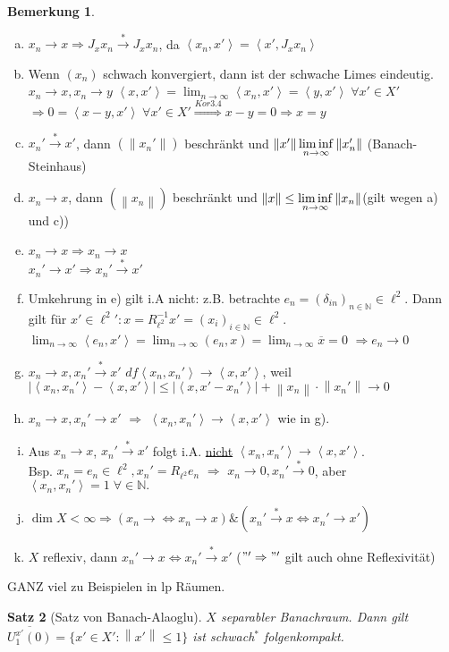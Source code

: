 \documentclass[ngerman]{report}
\theoremstyle{plain}%
\newtheorem{thm}{Satz}[chapter]
\theoremstyle{definition}%
\theoremstyle{myStyle}
\newtheorem{bem}[thm]{Bemerkung}
\newcommand{\N}{\mathbb{N}}
\newcommand{\norm}[1]{\left \|#1\right\| }
\newcommand{\df}[1][]{%
	\overset{#1}{\Rightarrow}
}
\newcommand{\aq}{\Leftrightarrow} %
\newcommand{\limes}[1][\infty]{\lim_{n \to #1}}
\newcommand{\inv}[1]{#1^{-1}}
\newcommand{\ov}[1]{\overline{#1}}
\newcommand{\set}[1]{\{#1\}} %
\newcommand{\fop}[1]{\left \langle #1 \right \rangle} %
\newcommand{\wkc}{\longrightarrow} %
\newcommand{\wskc}{\overset{*}{\longrightarrow}} %
\begin{document}
	\begin{bem}
		\begin{enumerate}[a)]
			\item  $x_n \longrightarrow x \df J_x x_n \overset{*}{\longrightarrow} J_x x_n$, da $\fop{x_n, x'} = \fop{x', J_x x_n}$
			\item Wenn $(x_n)$ schwach konvergiert, dann ist der schwache Limes eindeutig. $x_n \to x, x_n \wkc y$ $\fop{x,x'} =\limes \fop{x_n,x'} = \fop{y, x'} \; \forall x' \in X'$ 
				$\df 0 = \fop{x-y,x'} \; \forall x' \in X' \df[Kor3.4] x-y = 0 \df x = y$
			\item $x_n' \wskc x'$, dann $(\norm{x_n'})$ beschränkt und $\norm{x'} \limesinf \norm{x_n'}$ (Banach-Steinhaus)
			\item $x_n \to x$, dann $(\norm{x_n})$ beschränkt und $\norm{x} \leq \limesinf \norm{x_n}$(gilt wegen a) und c))
			\item $x_n \to x \df x_n \wkc x$\\
			$x_n' \to x' \df x_n' \wskc x'$
			\item Umkehrung in e) gilt i.A nicht: z.B. betrachte $e_n = (\delta_{in})_{n\in \N} \in \ell^2$. Dann gilt für $x' \in \ell^2{'}: x = \inv{R_{\ell^2}} x' = (x_i)_{i\in\N}\in \ell^2$.
			$\limes \fop{e_n, x'} = \limes (e_n,x) = \limes \ov{x} = 0$ $\df e_n \wkc 0$
			\item $x_n \to x, x_n' \wskc x'$ $df \fop{x_n,x_n'} \to \fop{x,x'}$, weil $|\fop{x_n,x_n'} - \fop{x,x'}| \leq |\fop{x,x' - x_n'}| + \norm{x_n} \cdot \norm{x_n'} \to 0$
			\item $x_n \wkc x, x_n' \to x'$ $\df$ $\fop{x_n,x_n'} \to \fop{x,x'}$ wie in g).
			\item Aus $x_n \wkc x$, $x_n' \wskc x'$ folgt i.A. \underline{nicht} $\fop{x_n,x_n'} \to \fop{x,x'}$. \\
			Bsp. $x_n = e_n \in \ell^2, x_n' = R_{\ell^2} e_n$ $\df$ $x_n \wkc 0, x_n' \wskc 0$, aber $\fop{x_n,x_n'} = 1 \; \forall \in \N.$
			\item $\dim X < \infty \df  (x_n \wkc \aq x_n \to x) \& (x_n' \wskc x \aq x_n' \wkc x')$
			\item $X$ reflexiv, dann $x_n' \wkc x \aq x_n' \wskc x'$ ($"' \df "'$ gilt auch ohne Reflexivität)
		\end{enumerate}
	\end{bem}
GANZ viel zu Beispielen in lp Räumen.
	\begin{thm}[Satz von Banach-Alaoglu]
		$X$ separabler Banachraum. Dann gilt $\ov{U_1^{x'}(0)} = \set{x' \in X' : \norm{x'} \leq 1 }$ ist schwach$^*$ folgenkompakt.	
	\end{thm}
\end{document}
